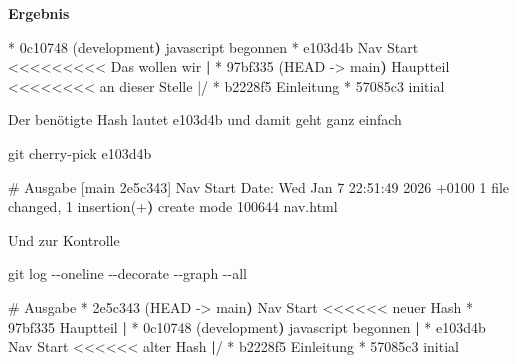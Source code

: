 \documentclass[
  ngerman,
  letterpaper,
  DIV=11]{scrreprt}
\newenvironment{Shaded}{\begin{snugshade}}{\end{snugshade}}
\newcommand{\AttributeTok}[1]{\textcolor[rgb]{0.40,0.45,0.13}{#1}}
\newcommand{\CommentTok}[1]{\textcolor[rgb]{0.37,0.37,0.37}{#1}}
\newcommand{\ErrorTok}[1]{\textcolor[rgb]{0.68,0.00,0.00}{#1}}
\newcommand{\ExtensionTok}[1]{\textcolor[rgb]{0.00,0.23,0.31}{#1}}
\newcommand{\FunctionTok}[1]{\textcolor[rgb]{0.28,0.35,0.67}{#1}}
\newcommand{\KeywordTok}[1]{\textcolor[rgb]{0.00,0.23,0.31}{\textbf{#1}}}
\newcommand{\NormalTok}[1]{\textcolor[rgb]{0.00,0.23,0.31}{#1}}
\newcommand{\OperatorTok}[1]{\textcolor[rgb]{0.37,0.37,0.37}{#1}}
\newcommand{\StringTok}[1]{\textcolor[rgb]{0.13,0.47,0.30}{#1}}
\begin{document}
\textbf{Ergebnis}

\begin{Shaded}
\begin{Highlighting}[]
\ExtensionTok{*}\NormalTok{ 0c10748 }\ErrorTok{(}\ExtensionTok{development}\KeywordTok{)} \ExtensionTok{javascript}\NormalTok{ begonnen}
\ExtensionTok{*}\NormalTok{ e103d4b Nav Start     }\OperatorTok{\textless{}\textless{}\textless{}\textless{}\textless{}\textless{}\textless{}\textless{}\textless{}}\NormalTok{ Das wollen wir}
\KeywordTok{|} \ExtensionTok{*}\NormalTok{ 97bf335 }\ErrorTok{(}\ExtensionTok{HEAD} \AttributeTok{{-}}\OperatorTok{\textgreater{}}\NormalTok{ main}\KeywordTok{)} \ExtensionTok{Hauptteil}  \OperatorTok{\textless{}\textless{}\textless{}\textless{}\textless{}\textless{}\textless{}\textless{} an}\NormalTok{ dieser Stelle}
\StringTok{|/  }
\StringTok{* b2228f5 Einleitung}
\StringTok{* 57085c3 initial}
\end{Highlighting}
\end{Shaded}

Der benötigte Hash lautet e103d4b und damit geht ganz einfach

\begin{Shaded}
\begin{Highlighting}[]
\FunctionTok{git}\NormalTok{ cherry{-}pick e103d4b}

\CommentTok{\# Ausgabe}
\ExtensionTok{[main}\NormalTok{ 2e5c343] Nav Start}
 \ExtensionTok{Date:}\NormalTok{ Wed Jan 7 22:51:49 2026 +0100}
 \ExtensionTok{1}\NormalTok{ file changed, 1 insertion}\ErrorTok{(}\ExtensionTok{+}\KeywordTok{)}
 \ExtensionTok{create}\NormalTok{ mode 100644 nav.html}
\end{Highlighting}
\end{Shaded}

Und zur Kontrolle

\begin{Shaded}
\begin{Highlighting}[]
\FunctionTok{git}\NormalTok{ log }\AttributeTok{{-}{-}oneline} \AttributeTok{{-}{-}decorate} \AttributeTok{{-}{-}graph} \AttributeTok{{-}{-}all}

\CommentTok{\# Ausgabe}
\ExtensionTok{*}\NormalTok{ 2e5c343 }\ErrorTok{(}\ExtensionTok{HEAD} \AttributeTok{{-}}\OperatorTok{\textgreater{}}\NormalTok{ main}\KeywordTok{)} \ExtensionTok{Nav}\NormalTok{ Start    }\OperatorTok{\textless{}\textless{}\textless{}\textless{}\textless{}\textless{}}\NormalTok{ neuer Hash}
\ExtensionTok{*}\NormalTok{ 97bf335 Hauptteil}
\KeywordTok{|} \ExtensionTok{*}\NormalTok{ 0c10748 }\ErrorTok{(}\ExtensionTok{development}\KeywordTok{)} \ExtensionTok{javascript}\NormalTok{ begonnen}
\KeywordTok{|} \ExtensionTok{*}\NormalTok{ e103d4b Nav Start                 }\OperatorTok{\textless{}\textless{}\textless{}\textless{}\textless{}\textless{}}\NormalTok{ alter Hash}
\KeywordTok{|}\ExtensionTok{/}  
\ExtensionTok{*}\NormalTok{ b2228f5 Einleitung}
\ExtensionTok{*}\NormalTok{ 57085c3 initial}
\end{Highlighting}
\end{Shaded}
\end{document}
